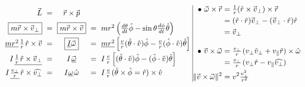 \documentclass[12pt]{article}
\newcommand{\hs}{\hspace{1pt}} %
\newcommand{\nhs}{\hspace{-1pt}} %
\newcommand{\hsvec}[1]{\nhs\vec{\hs #1}} %
\begin{document}
\vspace{20pt}\noindent
\(
    \arraycolsep=3pt\begin{array}{r c c c l}
        \hsvec{L} & = 
            & \hsvec{r} \times \hsvec{p} 
            \\[5pt]
        \boxed{ m \hsvec{r} \times \hsvec{v}_\perp } & = 
            & \boxed{ m \hsvec{r} \times \hsvec{v} }
            & = 
            & mr^2 \left( \tfrac{d\theta}{dt} \hat{\phi} - \sin\theta \tfrac{d\phi}{dt} \hat{\theta} \right) 
            \\[5pt] 
        \underline{m r^2} \hs \tfrac{1}{r} \hs \hat{r} \times \hsvec{v} & = 
            & \boxed{ \underline{I} \hsvec{\omega} }
            & = 
            & \underline{mr^2} \left[ 
                \tfrac{v}{r} (\hat{\theta} \cdot \hat{v}) \hat{\phi} 
                - \tfrac{v}{r} (\hat{\phi} \cdot \hat{v}) \hat{\theta} 
            \right]
            \\[5pt]
        I \hs \underline{ \tfrac{1}{r} \hs \hat{r} \times \hsvec{v}_\perp } & =
            & {I} \hs \underline{ \hsvec{\omega} }
            & =
            & {I} \hs \tfrac{v}{r} 
                \left[ (\hat{\theta} \cdot \hat{v}) \hat{\phi} - (\hat{\phi} \cdot \hat{v}) \hat{\theta} \right]
            \\[5pt]
        {I} \hs \underline{ \tfrac{v_\perp}{r} } \hs \hat{r} \times \widehat{v_\perp} & = 
            & I \underline{ \omega } \hs \hat{\omega}
            & = 
            & I \hs \tfrac{v}{r} \hs ( \hat{\theta} \times \hat{\phi} = \hat{r} ) \times \hat{v} 
    \end{array}
    \hfill
    \vline
    \hfill
    \begin{aligned}
        \bullet\ \hsvec{\omega} \times \hsvec{r} & = \tfrac{1}{r} (\hat{r} \times \hsvec{v}_\perp) \times \hsvec{r} \\
        & = (\hat{r} \cdot \hat{r}) \hsvec{v}_\perp - (\hsvec{v}_\perp \cdot \hat{r}) \hat{r}\\
        & = \hsvec{v}_\perp
            \\[10pt]
        \bullet\ \hsvec{v} \times \hsvec{\omega} & = 
            \tfrac{v_\perp}{r}\hs (v_\perp \hat{v}_\perp + v_\parallel \hat{r}) \times \hat{\omega}
            \\
        & = \tfrac{v_\perp}{r}\hs ( v_\perp \hat{r} - v_\parallel \widehat{v_\perp} )
            \\
        \Vert \hsvec{v} \times \hsvec{\omega} \Vert^2 & = v^2 \tfrac{v^2_\perp}{r^2}
    \end{aligned}
    \hfill\hs
\)
\end{document}
